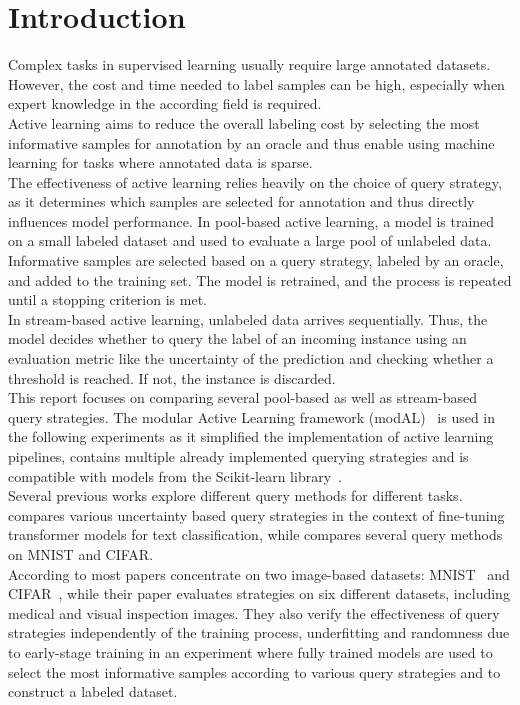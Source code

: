 \documentclass{article}
\theoremstyle{plain}
\theoremstyle{definition}
\theoremstyle{remark}
\begin{document}
\section{Introduction}\label{sec:intro}
Complex tasks in supervised learning usually require large annotated datasets. However, the cost and time needed to label samples can be high, especially when expert knowledge in the according field is required.  \\
Active learning aims to reduce the overall labeling cost by selecting the most informative samples for annotation by an oracle and thus enable using machine learning for tasks where annotated data is sparse. \\
The effectiveness of active learning relies heavily on the choice of query strategy, as it determines which samples are selected for annotation and thus directly influences model performance. In pool-based active learning, a model is trained on a small labeled dataset and used to evaluate a large pool of unlabeled data. Informative samples are selected based on a query strategy, labeled by an oracle, and added to the training set. The model is retrained, and the process is repeated until a stopping criterion is met. \\ 
In stream-based active learning, unlabeled data arrives sequentially. Thus, the model decides whether to query the label of an incoming instance using an evaluation metric like the uncertainty of the prediction and checking whether a threshold is reached. If not, the instance is discarded. \\
This report focuses on comparing several pool-based as well as stream-based query strategies. The modular Active Learning framework (modAL)~\cite{danka_modalmodularactivelearning} is used in the following experiments as it simplified the implementation of active learning pipelines, contains multiple already implemented querying strategies and is compatible with models from the Scikit-learn library~\cite{scikit-learn}. \\
Several previous works explore different query methods for different tasks. \\
\cite{schröder_revisitinguncertaintybasedquerystrategies} compares various uncertainty based query strategies in the context of fine-tuning transformer models for text classification, while \cite{zhan_comparativesurveydeepactive} compares several query methods on MNIST and CIFAR. \\
According to \cite{ueno_benchmarkingofquerystrategies} most papers concentrate on two image-based datasets: MNIST~\cite{mnist} and CIFAR~\cite{cifar}, while their paper evaluates strategies on six different datasets, including medical and visual inspection images. They also verify the effectiveness of query strategies independently of the training process, underfitting and randomness due to early-stage training in an experiment where fully trained models are used to select the most informative samples according to various query strategies and to construct a labeled dataset. \\ 
\end{document}
